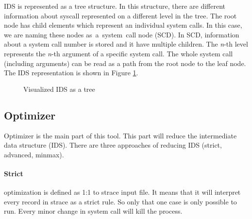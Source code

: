IDS is represented as a tree structure.
In this structure, there are different information about syscall represented on a different level in the tree.
The root node has child elements which represent an individual system calls.
In this case, we are naming these nodes as~a~system~call node (SCD).
In SCD, information about a system call number is stored and it have multiple children.
The \textit{n}-th level represents the \textit{n}-th argument of a specific system call.
The whole system call (including arguments) can be read as a path from the root node to the leaf node.
The IDS representation is shown in Figure \ref{fig:tikz:IDStree}.

\begin{figure}[H]
\centering
  \caption{Visualized IDS as a tree}
  \label{fig:tikz:IDStree}
\end{figure}

\subsection{Optimizer}
Optimizer is the main part of this tool.
This part will reduce the intermediate data structure (IDS).
There are three approaches of reducing IDS (strict, advanced, minmax).

	\paragraph{Strict}
	optimization is defined as 1:1 to strace input file.
	It means that it will interpret every record in strace as a strict rule.
	So only that one case is only possible to run.
	Every minor change in system call will kill the process.

